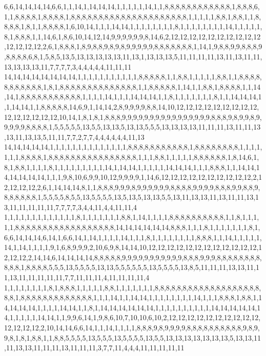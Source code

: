 6,6,14,14,14,14,6,6,1,1,14,1,14,14,14,1,1,1,1,1,14,1,1,8,8,8,8,8,8,8,8,8,8,8,8,1,8,8,8,6,1,1,8,8,8,8,1,8,8,8,8,1,8,8,8,8,8,8,8,8,8,8,8,8,8,8,8,8,8,8,8,8,8,1,1,1,1,1,8,8,1,8,8,1,1,8,8,8,8,1,8,1,1,8,8,8,8,1,6,10,14,1,1,1,14,14,1,1,1,1,1,1,1,1,8,1,1,1,1,1,1,1,1,14,1,1,1,1,1,8,1,8,8,8,1,1,14,6,1,8,6,10,14,12,14,9,9,9,9,9,9,8,14,6,2,12,12,12,12,12,12,12,12,12,12,12,12,12,12,2,6,1,8,8,8,1,8,9,8,8,9,8,9,8,9,9,9,9,9,8,8,8,8,8,8,8,1,14,1,9,8,8,9,9,8,8,8,9,8,8,8,8,6,8,1,5,8,5,13,5,13,13,13,13,13,11,13,1,13,13,13,5,11,11,11,11,13,11,13,11,11,13,13,13,13,11,7,7,7,7,3,4,4,4,4,4,11,11,11
14,14,14,14,14,14,14,14,1,1,1,1,1,1,1,1,1,1,1,8,8,8,8,8,1,1,8,8,1,1,1,1,1,8,8,1,1,8,8,8,8,8,8,8,8,8,8,8,1,8,1,8,8,8,8,8,8,8,8,8,8,8,8,8,8,1,1,8,8,8,8,8,1,14,1,1,8,8,1,8,8,8,8,1,1,14,14,1,8,8,8,8,8,8,8,8,8,8,8,1,1,1,1,14,1,1,1,14,14,14,1,1,8,1,1,1,1,1,1,1,8,1,1,14,14,14,1,1,14,14,1,1,8,8,8,8,8,14,6,9,1,14,14,2,8,9,9,9,9,8,8,14,10,12,12,12,12,12,12,12,12,12,12,12,12,12,12,12,10,14,1,8,1,8,1,8,8,8,9,9,9,9,9,9,9,9,9,9,9,9,9,9,9,9,8,8,8,9,8,9,9,8,9,9,9,9,9,8,8,8,8,1,5,5,5,5,5,13,5,5,13,13,5,13,13,5,5,5,13,13,13,13,11,11,11,13,11,11,13,13,11,13,13,5,11,11,7,7,2,7,7,4,4,4,4,4,4,11,13
14,14,14,14,14,1,1,1,1,1,1,1,1,1,1,1,1,1,1,8,8,8,8,8,8,8,8,8,8,8,1,8,8,8,8,8,8,8,8,1,1,1,1,1,1,1,8,8,8,8,1,8,8,8,8,8,8,8,8,8,8,8,8,8,8,8,8,1,1,1,8,8,1,1,1,1,1,8,8,8,8,8,8,1,8,14,6,1,8,1,8,8,1,1,1,1,8,1,1,1,1,1,1,1,1,1,14,1,14,14,1,1,1,1,1,14,14,14,1,1,1,8,8,8,1,1,14,14,14,14,14,14,14,1,1,1,9,8,10,6,9,9,10,12,9,9,9,9,1,14,6,12,12,12,12,12,12,12,12,12,12,2,12,12,12,12,2,6,1,14,14,14,8,1,1,8,8,8,9,9,9,8,9,9,9,9,9,9,8,8,8,8,9,9,9,9,8,8,8,9,9,8,8,9,8,8,8,8,8,8,1,5,5,5,5,8,5,5,13,5,5,5,5,13,5,13,5,13,13,5,5,13,11,13,13,11,13,11,11,13,13,11,11,11,11,11,7,7,7,7,3,4,4,11,4,4,11,11,4
1,1,1,1,1,1,1,1,1,1,1,1,1,8,1,1,1,1,1,1,1,8,8,1,14,1,1,1,1,8,8,8,8,8,8,8,8,8,8,1,1,8,1,1,1,1,1,8,8,8,8,8,8,8,8,8,8,8,8,8,8,8,8,8,8,14,14,14,14,14,14,8,8,8,1,1,1,8,1,1,1,1,1,1,1,8,1,6,6,14,14,14,6,14,1,6,6,14,1,14,1,1,1,1,14,1,1,1,8,1,1,1,1,1,1,1,1,8,8,8,1,1,14,1,1,1,1,1,14,1,14,1,1,1,1,9,1,6,8,9,9,9,2,10,6,9,8,14,14,10,12,12,12,12,12,12,12,12,12,12,12,12,12,12,12,2,14,14,6,14,14,14,14,8,8,8,8,8,9,9,9,9,9,9,9,9,9,9,9,8,8,8,9,9,9,8,8,8,8,8,8,8,8,8,8,8,1,8,8,8,8,5,5,5,13,5,5,5,5,13,13,5,5,5,5,5,5,13,5,5,5,5,13,8,5,11,11,11,13,13,11,11,13,11,11,11,11,11,7,7,11,11,11,4,11,11,11,11,4
1,1,1,1,1,1,1,1,8,1,8,8,8,1,1,1,1,1,8,8,1,1,1,1,1,1,1,8,8,8,8,8,8,8,8,8,8,8,8,8,8,8,8,8,8,8,8,8,1,8,8,8,8,8,8,8,8,8,8,8,8,8,1,1,1,14,1,1,14,14,1,1,1,1,1,1,1,1,14,1,1,1,8,8,8,1,8,8,1,14,14,14,14,1,1,1,1,14,14,1,1,8,1,14,14,14,14,14,14,1,1,1,1,1,1,1,1,1,1,14,14,14,14,14,14,1,1,1,1,1,14,14,1,1,9,9,6,14,1,9,8,6,10,7,10,10,6,10,2,12,12,12,12,12,12,12,12,12,12,12,12,12,12,2,10,14,14,6,6,14,1,1,14,1,1,1,1,8,8,8,9,8,9,9,9,9,8,8,8,8,8,8,8,8,8,8,9,8,9,9,8,1,8,1,8,8,1,1,8,8,5,5,5,5,13,5,5,5,13,5,5,5,5,13,5,5,13,13,13,13,13,13,13,5,13,13,11,11,13,13,11,11,11,13,11,11,11,3,7,7,11,4,4,4,11,11,11,11,11
